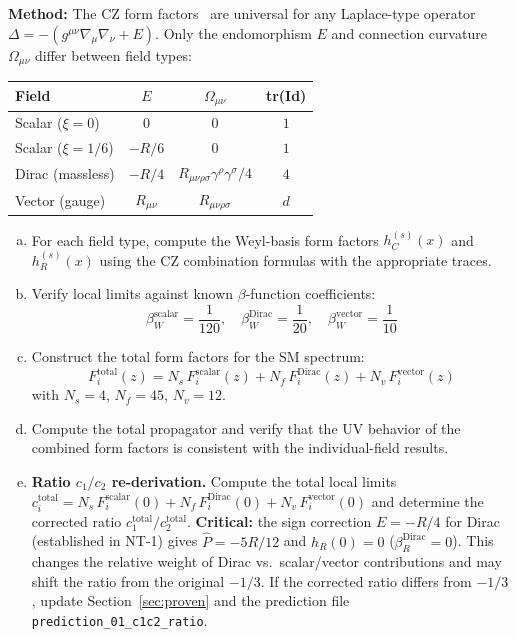 \documentclass[12pt,a4paper]{article}
\newcommand{\method}[1]{\noindent\textbf{Method:} #1\par}
\begin{document}
\method{
The CZ form factors~\cite{CZ2012} are universal for any Laplace-type operator
$\Delta = -(g^{\mu\nu}\nabla_\mu\nabla_\nu + E)$.
Only the endomorphism $E$ and connection curvature $\Omega_{\mu\nu}$ differ
between field types:
\begin{center}
\begin{tabular}{lccc}
\toprule
\textbf{Field} & $E$ & $\Omega_{\mu\nu}$ & \textbf{tr(Id)} \\
\midrule
Scalar ($\xi = 0$) & $0$ & $0$ & $1$ \\
Scalar ($\xi = 1/6$) & $-R/6$ & $0$ & $1$ \\
Dirac (massless) & $-R/4$ & $R_{\mu\nu\rho\sigma}\gamma^{\rho}\gamma^{\sigma}/4$ & $4$ \\
Vector (gauge) & $R_{\mu\nu}$ & $R_{\mu\nu\rho\sigma}$ & $d$ \\
\bottomrule
\end{tabular}
\end{center}
\begin{enumerate}[(a)]
  \item For each field type, compute the Weyl-basis form factors
    $h_C^{(s)}(x)$ and $h_R^{(s)}(x)$ using the CZ combination formulas
    with the appropriate traces.
  \item Verify local limits against known $\beta$-function coefficients:
    \begin{equation}
      \beta_W^{\text{scalar}} = \frac{1}{120}, \quad
      \beta_W^{\text{Dirac}} = \frac{1}{20}, \quad
      \beta_W^{\text{vector}} = \frac{1}{10}
    \end{equation}
  \item Construct the total form factors for the SM spectrum:
    \begin{equation}\label{eq:total-ff}
      F_i^{\text{total}}(z) = N_s\,F_i^{\text{scalar}}(z)
      + N_f\,F_i^{\text{Dirac}}(z) + N_v\,F_i^{\text{vector}}(z)
    \end{equation}
    with $N_s = 4$, $N_f = 45$, $N_v = 12$.
  \item Compute the total propagator and verify that the UV behavior of the
    combined form factors is consistent with the individual-field results.
  \item \textbf{Ratio $c_1/c_2$ re-derivation.} Compute the total local limits
    $c_i^{\text{total}} = N_s\,F_i^{\text{scalar}}(0) + N_f\,F_i^{\text{Dirac}}(0)
    + N_v\,F_i^{\text{vector}}(0)$ and determine the corrected ratio
    $c_1^{\text{total}}/c_2^{\text{total}}$.
    \textbf{Critical:} the sign correction $E = -R/4$ for Dirac (established in NT-1)
    gives $\hat{P} = -5R/12$ and $h_R(0) = 0$ ($\beta_R^{\text{Dirac}} = 0$).
    This changes the relative weight of Dirac vs.\ scalar/vector contributions
    and may shift the ratio from the original $-1/3$.
    If the corrected ratio differs from $-1/3$, update Section~\ref{sec:proven}
    and the prediction file \texttt{prediction\_01\_c1c2\_ratio}.
\end{enumerate}
}
\end{document}
